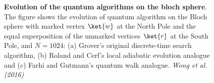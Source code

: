\begin{figure}[h]
     \centering
     \caption[Evolution of the quantum algorithms on the bloch sphere]{\textbf{Evolution of the quantum algorithms on the bloch sphere}. The figure shows the evolution of quantum algorithm on the Bloch sphere with marked vertex $\ket{w}$ at the North Pole and the equal superposition of the unmarked vertices $\ket{r}$ at the South Pole, and $N=1024$: (a) Grover's original discrete-time search algorithm, (b) Roland and Cerf's local adiabatic evolution analogue and (c) Farhi and Gutmann's quantum walk analogue. \textit{Wong et al. (2016)} \cite{Wong2016}}
     \label{fig:blochsphere}
\end{figure}

